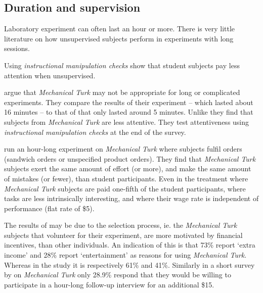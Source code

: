 \documentclass[preprint, 12pt]{elsarticle}
\begin{document}

\subsection{Duration and supervision}

Laboratory experiment can often last an hour or more. There is very little literature on how unsupervised subjects perform in  experiments with long sessions. 

Using \emph{instructional manipulation checks} \citet*{Oppenheimer_Meyvis_Davidenko_2009} show that student subjects pay less attention when unsupervised.

\cite{Goodman_Cryder_Cheema_2013} argue that \emph{Mechanical Turk} may not be appropriate for long or complicated experiments. They compare the results of their experiment -- which lasted about 16 minutes -- to that of \citet*{Paolacci_Chandler_Ipeirotis_2010} that only lasted around 5 minutes. Unlike \cite{Paolacci_Chandler_Ipeirotis_2010} they find that subjects from \emph{Mechanical Turk} are less attentive. They test attentiveness using \emph{instructional manipulation checks} at the end of the survey.

\citet*{Farrell_Grenier_Leiby_2014} run an hour-long experiment on \emph{Mechanical Turk} where subjects fulfil orders (sandwich orders or unspecified product orders). They find that \emph{Mechanical Turk} subjects exert the same amount of effort (or more), and make the same amount of mistakes (or fewer), than student participants. Even in the treatment where \emph{Mechanical Turk} subjects are paid one-fifth of the student participants, where tasks are less intrinsically interesting, and where their wage rate is independent of performance (flat rate of \$5).

The results of \cite{Farrell_Grenier_Leiby_2014} may be due to the selection process, ie. the \emph{Mechanical Turk} subjects that volunteer for their experiment, are more motivated by financial incentives, than other individuals. An indication of this is that 73\% report `extra income' and 28\% report `entertainment' as reasons for using \emph{Mechanical Turk}. Whereas in the \cite{Paolacci_Chandler_Ipeirotis_2010} study it is respectively 61\% and 41\%. Similarly in a short survey by \cite{Williamson_2014} on \emph{Mechanical Turk} only 28.9\% respond that they would be willing to participate in a hour-long follow-up interview for an additional \$15.
\end{document}

